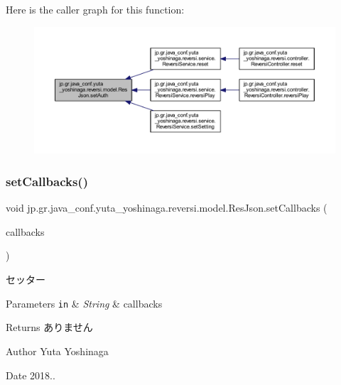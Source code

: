 Here is the caller graph for this function\+:
\nopagebreak
\begin{figure}[H]
\begin{center}
\leavevmode
\includegraphics[width=350pt]{classjp_1_1gr_1_1java__conf_1_1yuta__yoshinaga_1_1reversi_1_1model_1_1_res_json_aec94a5246bf7245af19f8f72100e986c_icgraph}
\end{center}
\end{figure}
\mbox{\label{classjp_1_1gr_1_1java__conf_1_1yuta__yoshinaga_1_1reversi_1_1model_1_1_res_json_a2c93a1f6a03a04909da59238c7e68ca3}} 
\subsubsection{\texorpdfstring{set\+Callbacks()}{setCallbacks()}}
{\footnotesize\ttfamily void jp.\+gr.\+java\+\_\+conf.\+yuta\+\_\+yoshinaga.\+reversi.\+model.\+Res\+Json.\+set\+Callbacks (\begin{DoxyParamCaption}\item[{\hyperlink{classjp_1_1gr_1_1java__conf_1_1yuta__yoshinaga_1_1reversi_1_1model_1_1_callbacks_json}{Callbacks\+Json}}]{callbacks }\end{DoxyParamCaption})}



セッター 


\begin{DoxyParams}[1]{Parameters}
\mbox{\tt in}  & {\em String} & callbacks \\
\hline
\end{DoxyParams}
\begin{DoxyReturn}{Returns}
ありません 
\end{DoxyReturn}
\begin{DoxyAuthor}{Author}
Yuta Yoshinaga 
\end{DoxyAuthor}
\begin{DoxyDate}{Date}
2018.. 
\end{DoxyDate}


